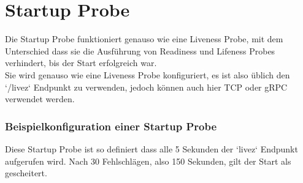 \section{Startup Probe}
Die Startup Probe funktioniert genauso wie eine Liveness Probe, mit dem Unterschied dass sie die Ausführung von Readiness und Lifeness Probes verhindert, bis der Start erfolgreich war.\\
Sie wird genauso wie eine Liveness Probe konfiguriert, es ist also üblich den `/livez` Endpunkt zu verwenden, jedoch können auch hier TCP oder gRPC verwendet werden.
\subsubsection{Beispielkonfiguration einer Startup Probe}
Diese Startup Probe ist so definiert dass alle 5 Sekunden der `livez` Endpunkt aufgerufen wird. Nach 30 Fehlschlägen, also 150 Sekunden, gilt der Start als gescheitert.

